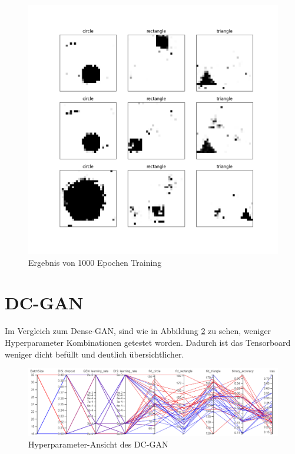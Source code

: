 \begin{figure}[H]
	\centering
	\includegraphics[height=0.35\textheight]{kapitel/5_ergebnisse/densegan/good_example_long.png}
	\caption{Ergebnis von 1000 Epochen Training}
	\label{ergebnis:densegan-good-example-long}
\end{figure}

\section{DC-GAN}
Im Vergleich zum Dense-GAN, sind wie in Abbildung \ref{ergebnis:dcgan-hyper} zu sehen, weniger Hyperparameter Kombinationen getestet worden.
Dadurch ist das Tensorboard weniger dicht befüllt und deutlich übersichtlicher.

\begin{figure}[H]
	\centering
	\includegraphics[width=0.75\textheight]{kapitel/5_ergebnisse/dcgan/hyperparameter.PNG}
	\caption{Hyperparameter-Ansicht des DC-GAN}
	\label{ergebnis:dcgan-hyper}
\end{figure}

